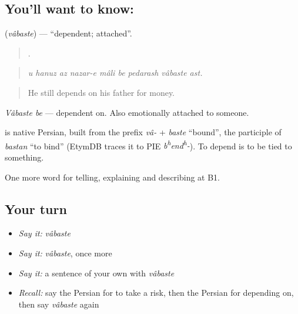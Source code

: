 \subsection*{You'll want to know: }
\textbf{} (\emph{vâbaste}) — \textquotedblleft{}dependent; attached\textquotedblright{}.

\begin{quote}
        .
\end{quote}

\begin{quote}
\emph{u hanuz az nazar-e mâli be pedarash vâbaste ast.}
\end{quote}

\begin{quote}
He still depends on his father for money.
\end{quote}

\emph{Vâbaste be} — dependent on. Also emotionally attached to someone.

\begin{cousinweb}
\textbf{} is native Persian, built from the prefix \emph{vâ-} + \emph{baste} \textquotedblleft{}bound\textquotedblright{}, the participle of \emph{bastan} \textquotedblleft{}to bind\textquotedblright{} (EtymDB traces it to PIE \emph{b\textsuperscript{h}end\textsuperscript{h}-}). To depend is to be tied to something.
\end{cousinweb}

\begin{grammarlens}[title={What you've built}]
One more word for telling, explaining and describing at B1.
\end{grammarlens}

\subsection*{Your turn}
\begin{itemize}
\raggedright
  \item \emph{Say it:} \emph{vâbaste}
  \item \emph{Say it:} \emph{vâbaste}, once more
  \item \emph{Say it:} a sentence of your own with \emph{vâbaste}
  \item \emph{Recall:} say the Persian for to take a risk, then the Persian for depending on, then say \emph{vâbaste} again
\end{itemize}

